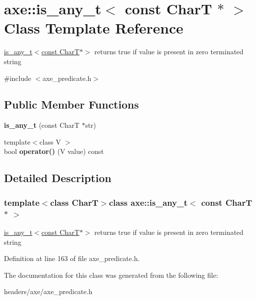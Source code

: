 \hypertarget{classaxe_1_1is__any__t_3_01const_01CharT_01_5_01_4}{\section{axe\+:\+:is\+\_\+any\+\_\+t$<$ const Char\+T $\ast$ $>$ Class Template Reference}
\label{classaxe_1_1is__any__t_3_01const_01CharT_01_5_01_4}
}


\hyperlink{classaxe_1_1is__any__t_3_01const_01CharT_01_5_01_4}{is\+\_\+any\+\_\+t$<$const Char\+T$\ast$$>$} returns true if value is present in zero terminated string  




{\ttfamily \#include $<$axe\+\_\+predicate.\+h$>$}

\subsection*{Public Member Functions}
\begin{DoxyCompactItemize}
\item 
\hypertarget{classaxe_1_1is__any__t_3_01const_01CharT_01_5_01_4_ae433f12265637c4044e55f5c666b2a3c}{{\bfseries is\+\_\+any\+\_\+t} (const Char\+T $\ast$str)}\label{classaxe_1_1is__any__t_3_01const_01CharT_01_5_01_4_ae433f12265637c4044e55f5c666b2a3c}

\item 
\hypertarget{classaxe_1_1is__any__t_3_01const_01CharT_01_5_01_4_a2a3685268b665c72af92dc59741ae08e}{{\footnotesize template$<$class V $>$ }\\bool {\bfseries operator()} (V value) const }\label{classaxe_1_1is__any__t_3_01const_01CharT_01_5_01_4_a2a3685268b665c72af92dc59741ae08e}

\end{DoxyCompactItemize}


\subsection{Detailed Description}
\subsubsection*{template$<$class Char\+T$>$class axe\+::is\+\_\+any\+\_\+t$<$ const Char\+T $\ast$ $>$}

\hyperlink{classaxe_1_1is__any__t_3_01const_01CharT_01_5_01_4}{is\+\_\+any\+\_\+t$<$const Char\+T$\ast$$>$} returns true if value is present in zero terminated string 

Definition at line 163 of file axe\+\_\+predicate.\+h.



The documentation for this class was generated from the following file\+:\begin{DoxyCompactItemize}
\item 
headers/axe/axe\+\_\+predicate.\+h\end{DoxyCompactItemize}
